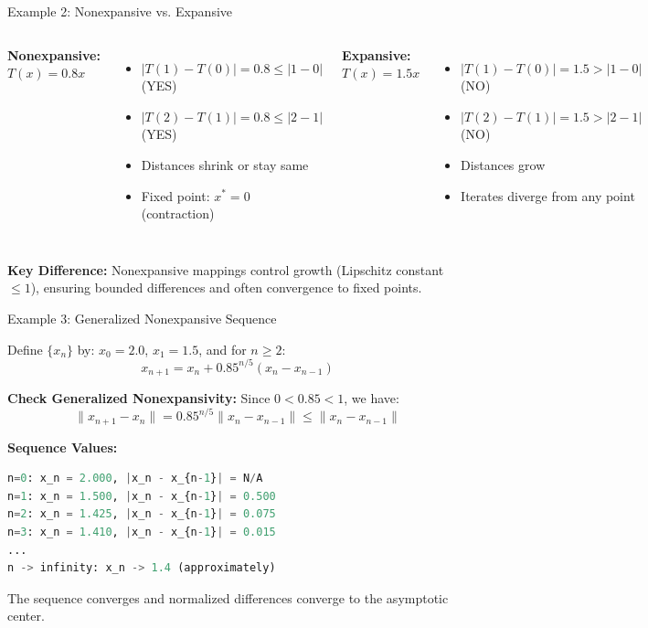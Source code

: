 \documentclass[aspectratio=169,10pt]{beamer}
\begin{document}
\begin{frame}[fragile]{Example 2: Nonexpansive vs. Expansive}
    \begin{columns}
        \textbf{Nonexpansive: } $T(x) = 0.8x$

        \begin{itemize}
            \item $|T(1) - T(0)| = 0.8 \leq |1 - 0|$ (YES)
            \item $|T(2) - T(1)| = 0.8 \leq |2 - 1|$ (YES)
            \item Distances shrink or stay same
            \item Fixed point: $x^* = 0$ (contraction)
        \end{itemize}

        \textbf{Expansive: } $T(x) = 1.5x$

        \begin{itemize}
            \item $|T(1) - T(0)| = 1.5 > |1 - 0|$ (NO)
            \item $|T(2) - T(1)| = 1.5 > |2 - 1|$ (NO)
            \item Distances grow
            \item Iterates diverge from any point
        \end{itemize}
    \end{columns}

    \vspace{0.8cm}

    \textbf{Key Difference:} Nonexpansive mappings control growth (Lipschitz constant $\leq 1$), ensuring bounded differences and often convergence to fixed points.
\end{frame}

\begin{frame}[fragile]{Example 3: Generalized Nonexpansive Sequence}
    \begin{example}
        Define $\{x_n\}$ by: $x_0 = 2.0$, $x_1 = 1.5$, and for $n \geq 2$:
        \[
        x_{n+1} = x_n + 0.85^{n/5} (x_n - x_{n-1})
        \]

        \textbf{Check Generalized Nonexpansivity:}
        Since $0 < 0.85 < 1$, we have:
        \[
        \|x_{n+1} - x_n\| = 0.85^{n/5} \|x_n - x_{n-1}\| \leq \|x_n - x_{n-1}\|
        \]

        \vspace{0.3cm}

        \textbf{Sequence Values:}
        \begin{lstlisting}[language=Python,mathescape=false]
n=0: x_n = 2.000, |x_n - x_{n-1}| = N/A
n=1: x_n = 1.500, |x_n - x_{n-1}| = 0.500
n=2: x_n = 1.425, |x_n - x_{n-1}| = 0.075
n=3: x_n = 1.410, |x_n - x_{n-1}| = 0.015
...
n -> infinity: x_n -> 1.4 (approximately)
        \end{lstlisting}

        The sequence converges and normalized differences converge to the asymptotic center.
    \end{example}
\end{frame}
\end{document}
